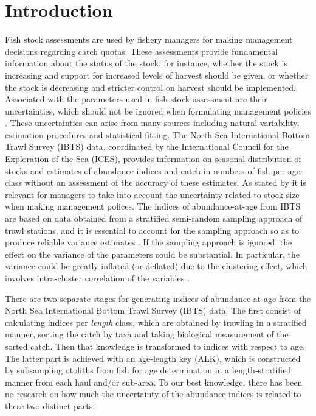 \documentclass[a4paper 12pt]{article}
\numberwithin{equation}{section}
\begin{document}
\section{Introduction}
Fish stock assessments are used by fishery managers for making management decisions regarding catch quotas. These assessments provide fundamental information about the status of the stock, for instance, whether the stock is increasing and support for increased levels of harvest should be given, or whether the stock is decreasing and stricter control on harvest should be implemented. Associated with the parameters used in fish stock assessment are their uncertainties, which should not be ignored when formulating management policies \citep{ludwig1981measurement, berg2014evaluation}. These uncertainties can arise from many sources including natural variability, estimation procedures and statistical fitting. The North Sea International Bottom Trawl Survey (IBTS) data, coordinated by the International Council for the Exploration of the Sea (ICES), provides information on seasonal distribution of stocks and estimates of abundance indices and catch in numbers of fish per age-class without an assessment of the accuracy of these estimates. As stated by \citet{ludwig1981measurement} it is relevant for managers to take into account the uncertainty related to stock size when making management polices. The indices of abundance-at-age from IBTS  are based on data obtained from a stratified semi-random sampling approach of trawl stations,  and  it is essential to account for the sampling approach so as to produce reliable variance estimates \citep{lehtonen2004practical}. If the sampling approach is ignored, the effect on the variance  of the parameters could be substantial.  In particular, the variance could be greatly inflated (or deflated)  due to the clustering effect, which involves intra-cluster correlation of the variables \citep{aanes2015efficient, lehtonen2004practical}. 

There are two separate stages for generating indices of abundance-at-age from the North Sea International Bottom Trawl Survey (IBTS) data.  The first consist of calculating indices per \textit{length} class, which are obtained by trawling in a stratified manner, sorting the catch by taxa and taking biological measurement of the sorted catch. Then that knowledge is transformed to indices with respect to age. The latter part is achieved with an age-length key (ALK), which is constructed by subsampling otoliths from fish for age determination in a length-stratified manner from each haul and/or sub-area. To our best knowledge, there has been no research on how much the uncertainty of the abundance indices is related to these two distinct parts.
\end{document}

